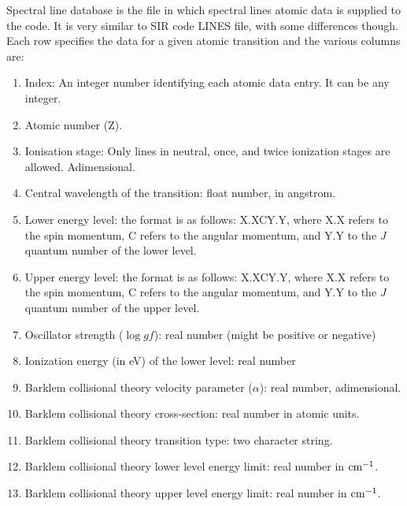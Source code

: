 
\label{sec:spectral_line_database}
%

Spectral line database is the file in which spectral lines atomic data is supplied to the code. It is very similar to SIR code LINES file, with some differences though. Each row specifies the data for a given atomic transition and the various columns are:
\begin{enumerate}
  \item Index: An integer number identifying each atomic data entry. It can be any integer.
  \item Atomic number (Z).
  \item Ionisation stage: Only lines in neutral, once, and twice ionization stages are allowed. Adimensional.
  \item Central wavelength of the transition: float number, in angstrom.
  \item Lower energy level: the format is as follows: X.XCY.Y, where X.X refers to the spin momentum, C refers to the angular momentum, and Y.Y to the $J$ quantum number of the lower level.
  \item Upper energy level: the format is as follows: X.XCY.Y, where X.X refers to the spin momentum, C refers to the angular momentum, and Y.Y to the $J$ quantum number of the upper level.
  \item Oscillator strength ($\log gf$): real number (might be positive or negative)
  \item Ionization energy (in eV) of the lower level: real number
  \item Barklem collisional theory velocity parameter ($\alpha$): real number, adimensional.
  \item Barklem collisional theory cross-section: real number in atomic units.
  \item Barklem collisional theory transition type: two character string.
  \item Barklem collisional theory lower level energy limit: real number in ${\rm cm}^{-1}$.
  \item Barklem collisional theory upper level energy limit: real number in ${\rm cm}^{-1}$.
\end{enumerate}


